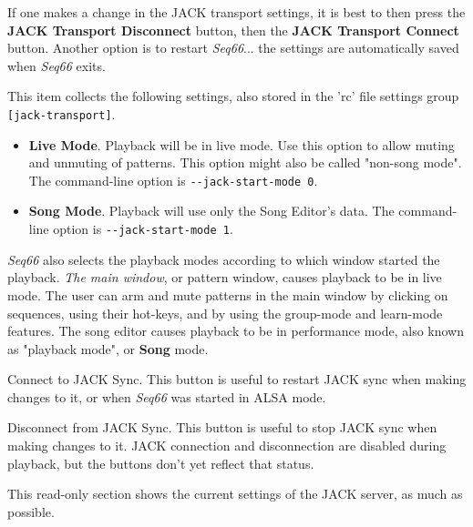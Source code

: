    If one makes a change in the JACK transport settings, it is best to
   then press the \textbf{JACK Transport Disconnect} button, then the
   \textbf{JACK Transport Connect} button.
   Another option is to restart
   \textsl{Seq66}... the settings are automatically saved when
   \textsl{Seq66} exits.

   This item collects the following settings, also stored in the 'rc' file
   settings group \texttt{[jack-transport]}.

   \begin{itemize}
      \item \textbf{Live Mode}.
         Playback will be in live mode.  Use this option to allow muting and
         unmuting of patterns.  This option might also be called "non-song
         mode".
         The command-line option is \texttt{-{}-jack-start-mode 0}.
      \item \textbf{Song Mode}.
         Playback will use only the Song Editor's data.
         The command-line option is \texttt{-{}-jack-start-mode 1}.
   \end{itemize}

   \textsl{Seq66} also selects the playback modes
   according to which window started the playback.
   \textsl{The main window}, or pattern
   window, causes playback to be in live mode.  The user can arm and mute
   patterns in the main window by clicking on sequences, using their hot-keys,
   and by using the group-mode and learn-mode features.
   The song editor causes playback to be in performance mode, also known as
   "playback mode", or \textbf{Song} mode.

   Connect to JACK Sync.
   This button is useful to restart JACK sync when making changes to it,
   or when \textsl{Seq66} was started in ALSA mode.

   Disconnect from JACK Sync.
   This button is useful to stop JACK sync when making changes to it.
   JACK connection and disconnection are disabled during playback, but the
   buttons don't yet reflect that status.

   This read-only section shows the current settings of the JACK
   server, as much as possible.

